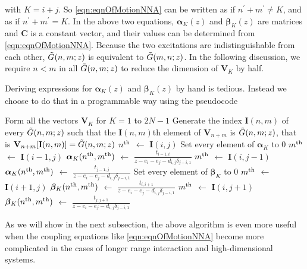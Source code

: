 with $K = i + j$. So \autoref{eqn:eqnOfMotionNNA} can be written as
if $n^{\prime} + m^{\prime} \neq K$, and as
if $n^{\prime} + m^{\prime} = K$. In the above two equations, $\boldsymbol\alpha_{K}(z)$ and
 $\boldsymbol\beta_{K}(z)$
are matrices and $\mathbf{C}$ is a constant vector, and their values can be determined from 
\autoref{eqn:eqnOfMotionNNA}. Because the two excitations are indistinguishable from each other, $\Tilde{G}(n, m; z)$ is equivalent 
to $\Tilde{G}(m, n; z)$. In the following discussion, we require $n<m$ in all $\Tilde{G}(n, m; z)$ to reduce the dimension
 of $\mathbf{V}_{K}$ by half.

 Deriving expressions for $\boldsymbol\alpha_{K}(z)$ and
 $\boldsymbol\beta_{K}(z)$ by hand is tedious. Instead we choose to do that in a programmable way using the 
pseudocode
\begin{algorithmic}[1]
\State Form all the vectors $\mathbf{V}_{K}$ for $K=1$ to $2N-1$
\State Generate the index $\mathbf{I}(n,m)$ of every $\Tilde{G}(n, m; z)$ such that the $\mathbf{I}(n,m)$th element 
of $\mathbf{V}_{n+m}$ is $\Tilde{G}(n, m; z)$, that is $\mathbf{V}_{n+m}[\mathbf{I}(n,m)] = \Tilde{G}(n, m; z)$
     \State $n^{\rm th}$ $\gets$ $\mathbf{I}(i,j)$
     \State Set every element of $\boldsymbol\alpha_{K}$ to 0
                   \State $m^{\rm th}$ $\gets$ $ \mathbf{I}(i-1, j)$  
                   \State $\boldsymbol\alpha_{K}(n^{\rm th}, m^{\rm th})$ $\gets$ $\frac{t_{i-1, i}}{z - e_{i} - e_{j} -   d_{i, j} \delta_{j-i, 1}}$
       \EndIf
%
                   \State $m^{\rm th}$ $\gets$ $ \mathbf{I}(i, j-1)$  
                   \State $\boldsymbol\alpha_{K}(n^{\rm th}, m^{\rm th})$ $\gets$ $\frac{t_{j-1, j}}{z - e_{i} - e_{j} -   d_{i, j} \delta_{j-i, 1}}$
       \EndIf
        \State Set every element of $\boldsymbol\beta_{K}$ to 0
                   \State $m^{\rm th}$ $\gets$ $ \mathbf{I}(i+1, j)$  
                   \State $\boldsymbol\beta_{K}(n^{\rm th}, m^{\rm th})$ $\gets$ $\frac{t_{i, i+1}}{z - e_{i} - e_{j} -   d_{i, j} \delta_{j-i, 1}}$
       \EndIf
%
                   \State $m^{\rm th}$ $\gets$ $ \mathbf{I}(i, j+1)$  
                   \State $\boldsymbol\beta_{K}(n^{\rm th}, m^{\rm th})$ $\gets$ $\frac{t_{j, j+1}}{z - e_{i} - e_{j} -   d_{i, j} \delta_{j-i, 1}}$
       \EndIf
\EndFor
\end{algorithmic}
As we will show in the next subsection, the above algorithm is even more useful when the coupling equations like
\autoref{eqn:eqnOfMotionNNA} become more complicated in the cases of
 longer range interaction and high-dimensional systems.

